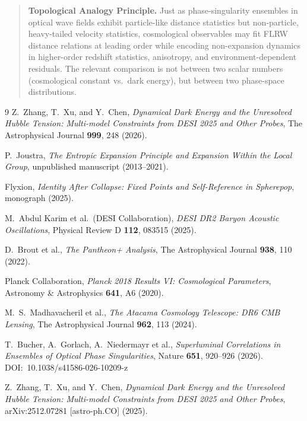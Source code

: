 \documentclass[12pt,a4paper]{article}
\theoremstyle{remark}
\begin{document}
\begin{quote}
\textbf{Topological Analogy Principle.}
Just as phase-singularity ensembles in optical wave fields exhibit
particle-like distance statistics but non-particle, heavy-tailed velocity
statistics, cosmological observables may fit FLRW distance relations at leading
order while encoding non-expansion dynamics in higher-order redshift statistics,
anisotropy, and environment-dependent residuals. The relevant comparison is not
between two scalar numbers (cosmological constant vs.\ dark energy), but between
two phase-space distributions.
\end{quote}


\begin{thebibliography}{9}
Z.\ Zhang, T.\ Xu, and Y.\ Chen,
\textit{Dynamical Dark Energy and the Unresolved Hubble Tension: Multi-model Constraints from DESI 2025 and Other Probes},
The Astrophysical Journal \textbf{999}, 248 (2026).

P.\ Joustra,
\textit{The Entropic Expansion Principle and Expansion Within the Local Group},
unpublished manuscript (2013--2021).

Flyxion,
\textit{Identity After Collapse: Fixed Points and Self-Reference in Spherepop},
monograph (2025).

M.\ Abdul Karim et al.\ (DESI Collaboration),
\textit{DESI DR2 Baryon Acoustic Oscillations},
Physical Review D \textbf{112}, 083515 (2025).

D.\ Brout et al.,
\textit{The Pantheon+ Analysis},
The Astrophysical Journal \textbf{938}, 110 (2022).

Planck Collaboration,
\textit{Planck 2018 Results VI: Cosmological Parameters},
Astronomy \& Astrophysics \textbf{641}, A6 (2020).

M.\ S.\ Madhavacheril et al.,
\textit{The Atacama Cosmology Telescope: DR6 CMB Lensing},
The Astrophysical Journal \textbf{962}, 113 (2024).

T.\ Bucher, A.\ Gorlach, A.\ Niedermayr et al.,
\textit{Superluminal Correlations in Ensembles of Optical Phase Singularities},
Nature \textbf{651}, 920--926 (2026).
DOI:~10.1038/s41586-026-10209-z

Z.\ Zhang, T.\ Xu, and Y.\ Chen,
\textit{Dynamical Dark Energy and the Unresolved Hubble Tension: Multi-model Constraints from DESI 2025 and Other Probes},
arXiv:2512.07281 [astro-ph.CO] (2025).
\end{thebibliography}
\end{document}
